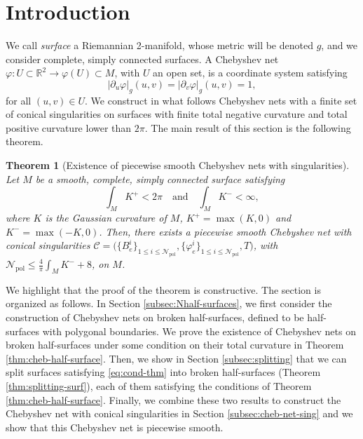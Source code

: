\documentclass{article}
\newcommand{\R}{\mathbb{R}}
\newcommand{\surf}{M}
\newcommand{\DU}{\partial_{u}}
\newcommand{\DV}{\partial_{v}}
\newcommand{\halfP}{B}
\newcommand{\Nsing}{\mathcal{N}_{\mathrm{sing}}}
\newcommand{\Npol}{\mathcal{N}_{\mathrm{pol}}}
\newtheorem{theorem}{Theorem}
\theoremstyle{remark}
\theoremstyle{prpart}
\newcommand{\CC}{\mathcal{C}}
\begin{document}
\section{Introduction}
We call {\em surface} a Riemannian 2-manifold, whose metric will be denoted $g$, and we consider complete, simply connected surfaces. 
A Chebyshev net $\varphi:U\subset\R^2\to\varphi(U)\subset\surf$, with $U$ an open set, is a coordinate system satisfying
\begin{equation}\label{eq:cheb-def}
  |\DU\varphi|_g(u,v) = |\DV\varphi|_g(u,v) = 1,
\end{equation}
for all $(u,v)\in U$.
We construct in what follows Chebyshev nets with a finite set of conical singularities on surfaces with finite total negative curvature and total positive curvature lower than $2\pi$. The main result of this section is the following theorem.
\begin{theorem}[Existence of piecewise smooth Chebyshev nets with singularities]\label{thm:existence-cheb-net}
  Let $\surf$ be a smooth, complete, simply connected surface satisfying
\begin{equation} \label{eq:cond-thm2}
  \int_{\surf}K^+<2\pi\quad\text{and}\quad\int_{\surf}K^-<\infty,
\end{equation}
where $K$ is the Gaussian curvature of $\surf$, $K^+=\max(K,0)$ and $K^-=\max(-K,0)$. %
Then, there exists a piecewise smooth Chebyshev net with conical singularities \sloppy$\CC=\big(\{\halfP^i_e\}_{1\leq i\leq \Npol}, \{\varphi^i_e\}_{1\leq i\leq \Npol}, T)$, with $\Npol\leq \frac{4}{\pi}\int_\surf K^-+8$, on $\surf$.
\end{theorem}
We highlight that the proof of the theorem is constructive. %
The section is organized as follows. In Section \ref{subsec:Nhalf-surfaces}, we first consider the construction of Chebyshev nets on broken half-surfaces, defined to be half-surfaces with polygonal boundaries. We prove the existence of Chebyshev nets on broken half-surfaces under some condition on their total curvature in Theorem \ref{thm:cheb-half-surface}. Then, we show in Section \ref{subsec:splitting} that we can split surfaces satisfying \eqref{eq:cond-thm} into broken half-surfaces (Theorem \ref{thm:splitting-surf}), each of them satisfying the conditions of Theorem \ref{thm:cheb-half-surface}. Finally, we combine these two results to construct the Chebyshev net with conical singularities in Section \ref{subsec:cheb-net-sing} and we show that this Chebyshev net is piecewise smooth.
\end{document}
